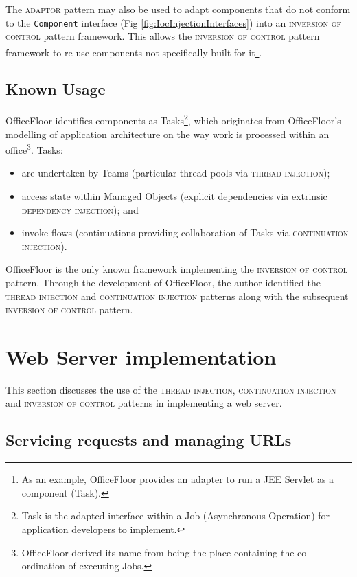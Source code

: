 \documentclass[prodmode]{style/acmlarge}
\begin{document}
The \textsc{adaptor} pattern may also be used to adapt components that do not
conform to the \texttt{Component} interface (Fig
\ref{fig:IocInjectionInterfaces}) into an \textsc{inversion of control} pattern
framework.  This allows the \textsc{inversion of control} pattern framework to re-use
components not specifically built for it\footnote{As an example, OfficeFloor
\cite{officefloor} provides an adapter to run a JEE Servlet as a component
(Task).}.


\subsection{Known Usage}

OfficeFloor \cite{officefloor} identifies components as Tasks\footnote{Task is
the adapted interface within a Job (Asynchronous Operation) for application
developers to implement.}, which originates from OfficeFloor's modelling of
application architecture on the way work is processed within an
office\footnote{OfficeFloor derived its name from being the place containing the
co-ordination of executing Jobs.}.  Tasks:
\begin{itemize}
  \item are undertaken by Teams (particular thread pools via \textsc{thread injection});
  \item access state within Managed Objects (explicit dependencies via extrinsic \textsc{dependency injection}); and
  \item invoke flows (continuations providing collaboration of Tasks via \textsc{continuation injection}).
\end{itemize}

OfficeFloor is the only known framework implementing the \textsc{inversion of
control} pattern.  Through the development of OfficeFloor, the author identified
the \textsc{thread injection} and \textsc{continuation injection} patterns along
with the subsequent \textsc{inversion of control} pattern.



\section{Web Server implementation}

This section discusses the use of the \textsc{thread injection},
\textsc{continuation injection} and \textsc{inversion of control} patterns in
implementing a web server.


\subsection{Servicing requests and managing URLs}
\end{document}
